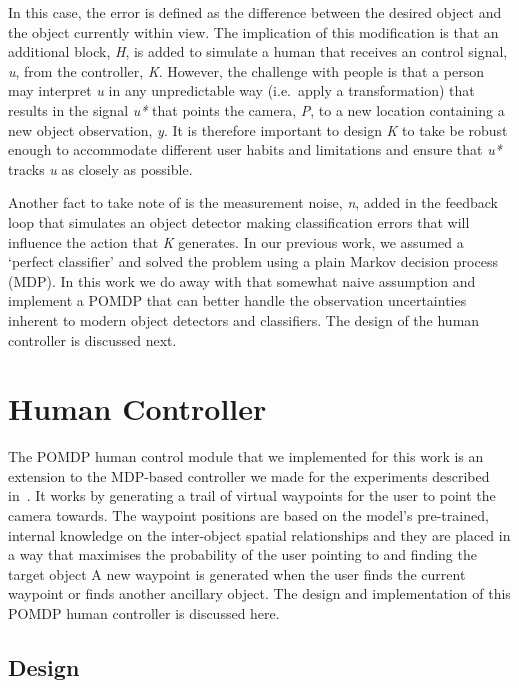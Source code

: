 \documentclass[runningheads]{llncs}
\newcommand\todo[1]{\textcolor{red}{#1}}
\begin{document}
In this case, the error is defined as the difference between the desired object and the object currently within view. 
The implication of this modification is that an additional block, \emph{H}, is added to simulate a human that receives an control signal, \emph{u}, from the controller, \emph{K}. 
However, the challenge with people is that a person may interpret \emph{u} in any unpredictable way (i.e.\ apply a transformation) that results in the signal \emph{u*} that points the camera, \emph{P}, to a new location containing a new object observation, \emph{y}.
It is therefore important to design \emph{K} to take be robust enough to accommodate different user habits and limitations and ensure that \emph{u*} tracks \emph{u} as closely as possible. 

Another fact to take note of is the measurement noise, \emph{n}, added in the feedback loop that simulates an object detector making classification errors that will influence the action that \emph{K} generates. 
In our previous work, we assumed a `perfect classifier' and solved the problem using a plain Markov decision process (MDP). 
In this work we do away with that somewhat naive assumption and implement a POMDP that can better handle the observation uncertainties inherent to modern object detectors and classifiers. 
The design of the human controller is discussed next. 

\section{Human Controller}\label{sec:human-controller}

The POMDP human control module that we implemented for this work is an extension to the MDP-based controller we made for the experiments described in~\cite{lock2019active}.
It works by generating a trail of virtual waypoints for the user to point the camera towards.
The waypoint positions are based on the model's pre-trained, internal knowledge on the inter-object spatial relationships and they are placed in a way that maximises the probability of the user pointing to and finding the target object
A new waypoint is generated when the user finds the current waypoint or finds another ancillary object.
The design and implementation of this POMDP human controller is discussed here.

\subsection{Design}
\end{document}
